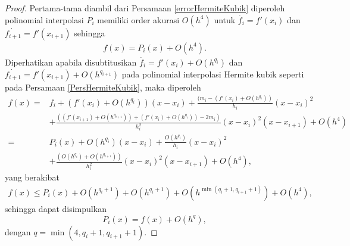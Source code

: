 \begin{proof}
    Pertama-tama diambil dari Persamaan \eqref{errorHermiteKubik} diperoleh polinomial interpolasi $P_i$ memiliki order akurasi $O(h^4)$ untuk $\dot{f_i}=f'(x_i)$ dan $\dot{f_{i+1}}=f'(x_{i+1})$ sehingga
    \begin{align*}
        f(x) = P_i(x) + O(h^4).
    \end{align*}
    Diperhatikan apabila disubtitusikan $\dot{f_i}=f'(x_i) + O(h^{q_i})$ dan \mbox{$\dot{f_{i+1}}=f'(x_{i+1}) + O(h^{q_{i+1}})$} pada polinomial interpolasi Hermite kubik seperti pada Persamaan \eqref{PersHermiteKubik}, maka diperoleh
    \begin{align*}
        f(x) =& f_i + (f'(x_i) + O(h^{q_i}))(x-x_i) + \frac{(m_i-(f'(x_i) + O(h^{q_i}))}{h_i}(x-x_i)^2 \\
        &+ \frac{((f'(x_{i+1}) + O(h^{q_{i+1}}))+(f'(x_i) + O(h^{q_i}))-2m_i)}{h_i^2}(x-x_i)^2(x-x_{i+1}) + O(h^4) \\
        =& P_i(x) + O(h^{q_i})(x-x_i) + \frac{O(h^{q_i})}{h_i}(x-x_i)^2 \\
        &+ \frac{(O(h^{q_i}) + O(h^{q_{i+1}}))}{h_i^2}(x-x_i)^2(x-x_{i+1}) + O(h^{4}),
    \end{align*}
    yang berakibat
    \begin{gather*}
        f(x)\leq P_i(x) + O(h^{q_i+1}) + O(h^{q_i+1}) + O(h^{\min(q_i+1,q_{i+1}+1)}) + O(h^{4}),
    \end{gather*}
    sehingga dapat disimpulkan
    \begin{equation*}
        P_i(x) = f(x) + O(h^q),
    \end{equation*}
    dengan $q=\min(4, q_i+1, q_{i+1}+1)$.
\end{proof}

